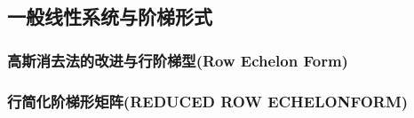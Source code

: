 \subsection{一般线性系统与阶梯形式}

\subsubsection{高斯消去法的改进与行阶梯型(Row Echelon Form)}

\subsubsection{行简化阶梯形矩阵(REDUCED ROW ECHELONFORM)}